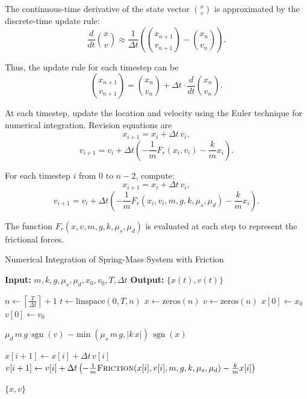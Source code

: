 \documentclass[12pt, a4paper, oneside]{report}
\begin{document}
The continuous-time derivative of the state vector \(\binom{x}{v}\) is approximated by the discrete-time update rule:
\[
	\frac{d}{dt} \binom{x}{v} \approx \frac{1}{\Delta t} \left( \binom{x_{n+1}}{v_{n+1}} - \binom{x_n}{v_n} \right).
\]

Thus, the update rule for each timestep can be
\[
	\binom{x_{n+1}}{v_{n+1}} = \binom{x_n}{v_n} + \Delta t \cdot \frac{d}{dt} \binom{x_n}{v_n}.
\]


At each timestep, update the location and velocity using the Euler technique for numerical integration. Revision equations are
\[
	x_{i+1} = x_i + \Delta t \, v_i,
\]
\[
	v_{i+1} = v_i + \Delta t \left( -\frac{1}{m} F_r(x_i, v_i) - \frac{k}{m} x_i \right).
\]

For each timestep \( i \) from \( 0 \) to \( n-2 \), compute:
\[
	x_{i+1} = x_i + \Delta t \, v_i,
\]
\[
	v_{i+1} = v_i + \Delta t \left( -\frac{1}{m} F_r(x_i, v_i, m, g, k, \mu_s, \mu_d) - \frac{k}{m} x_i \right).
\]

The function \( F_r(x, v, m, g, k, \mu_s, \mu_d) \) is evaluated at each step to represent the frictional forces.
\vspace*{\fill}\newpage
\begin{algorithm}
	\caption{Numerical Integration of Spring-Mass System with Friction}
	\begin{algorithmic}[1]
		\State \textbf{Input:} \( m, k, g, \mu_s, \mu_d, x_0, v_0, T, \Delta t \)
		\State \textbf{Output:} \( \{ x(t), v(t) \} \)

		\State \( n \gets \left\lceil \frac{T}{\Delta t} \right\rceil + 1 \)
		\State \( t \gets \text{linspace}(0, T, n) \)
		\State \( x \gets \text{zeros}(n) \)
		\State \( v \gets \text{zeros}(n) \)
		\State \( x[0] \gets x_0 \)
		\State \( v[0] \gets v_0 \)

		\State \Return \( \mu_d \, m \, g \, \operatorname{sgn}(v) \)
		\Else
		\State \Return \( -\min(\mu_s \, m \, g, |k \, x|) \, \operatorname{sgn}(x) \)
		\EndIf
		\EndFunction

		\State \( x[i+1] \gets x[i] + \Delta t \, v[i] \)
		\State \( v[i+1] \gets v[i] + \Delta t \left( -\frac{1}{m} \Call{Friction}{x[i], v[i], m, g, k, \mu_s, \mu_d} - \frac{k}{m} x[i] \right) \)
		\EndFor

		\State \Return \( \{ x, v \} \)
	\end{algorithmic}
\end{algorithm}
\end{document}

